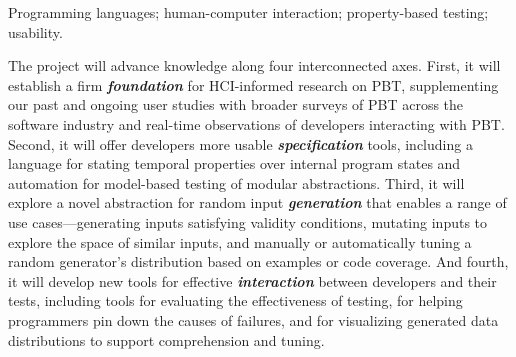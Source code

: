\smallskip

 Programming languages; human-computer
interaction; property-based testing; usability.

The project will advance knowledge along four
\iflater {} \fi
interconnected axes.
%
First, it will establish a firm {\bf\em foundation} for HCI-informed
research on PBT, supplementing our past and ongoing user studies with
broader surveys of PBT across the software industry and real-time
observations of developers interacting with PBT.
%
Second, it will offer developers more usable {\bf\em specification} tools,
including a language for stating temporal properties over internal
program states and automation for model-based testing of
modular abstractions.
%
Third, it will explore a novel abstraction for random input {\bf\em
  generation} that enables a range of use cases---generating inputs
satisfying validity conditions, mutating inputs to explore the space
of similar inputs, and manually or automatically tuning a random
generator's distribution based on examples or code coverage.
%
And fourth, it will develop new tools for effective {\bf\em
  interaction} between developers and their tests, including tools for
evaluating the effectiveness of testing, for helping programmers pin
down the causes of failures, and for visualizing generated data
distributions to support comprehension and tuning.



